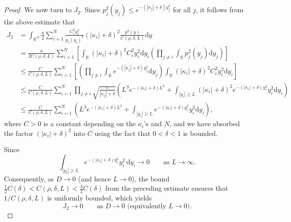 \documentclass[12pt,reqno]{amsart}
\numberwithin{equation}{section}
\begin{document}
\begin{proof}
We now turn to $J_2$. Since $p_j^2(y_j) \le e^{-(|\kappa_j|+\delta)y_j^2}$ for all $j$, it follows from the above estimate that
\begin{align*}
J_2&=\int_{\mathbb{R}^N}
\frac{a}{2}\sum_{i=1}^N
\frac{C_i^2 y_i^2}{p_i(y_i)^2} (|\kappa_i| + \delta)^2
\frac{p^2(y)}{C(\rho,\delta,L)}\mathrm{d}y\\
&=\frac{a}{2C(\rho,\delta,L)}\sum_{i=1}^N\left[
\int_{\mathbb{R}}
{(|\kappa_i| + \delta)^2 C_i^2  y_i^2}\mathrm{d}y_i
\left(\prod_{j\neq i}\int_{\mathbb{R}} {p_j^2(y_j)}\mathrm{d}y_j \right)\right]\\
&\leq
\frac{C }{C(\rho,\delta,L)}
\sum_{i=1}^N   \left[
 \left(\prod_{j\neq i}\int_{\mathbb{R}} e^{-(|\kappa_j|+\delta)y_j^2}\mathrm{d}y_j\right)\int_{\mathbb{R}}
{(|\kappa_i| + \delta)^2 C_i^2  y_i^2}\mathrm{d}y_i\right]
 \nonumber\\
&\le \frac{C }{C(\rho,\delta,L)}
\sum_{i=1}^N   
 \prod_{j \neq i} \sqrt{\frac{\pi}{|\kappa_j|+\delta}}\left(    L^3e^{-(|\kappa_i|+\delta)L^2}+\int_{|y_i|\ge L}
{(|\kappa_i| + \delta)^2 e^{-(|\kappa_i|+\delta)y_i^2}  y_i^2}\mathrm{d}y_i     \right)
 \nonumber\\
 &\le \frac{C }{C(\rho,\delta,L)}\sum_{i=1}^N   
 \left(     L^3e^{-(|\kappa_i|+\delta)L^2}+\int_{|y_i|\ge L}
{ e^{-(|\kappa_i|+\delta)y_i^2}  y_i^2}\mathrm{d}y_i     \right),
\end{align*}
where $C>0$ is a constant depending on the $\kappa_i$'s and $N$, and we have absorbed the factor $(|\kappa_i|+\delta)^2$ into $C$ using the fact that $0<\delta<1$ is bounded.

Since 
\[
\int_{|y_i|\ge L} e^{-(|\kappa_i|+\delta)y_i^2} y_i^2\,\mathrm{d}y_i \longrightarrow 0
\qquad \text{as } L\to\infty.
\]
Consequently, as \(D\to 0\) (and hence \(L\to 0\)), the bound 
$
\frac12 C(\delta) < C(\rho,\delta,L) < \frac32 C(\delta)
$
from the preceding estimate ensures that \(1/C(\rho,\delta,L)\) is uniformly bounded, which yields
\[
J_2 \longrightarrow 0 \qquad \text{as } D\to 0 \text{ (equivalently }L\to 0\text{)}.
\]




\end{proof}
\end{document}
